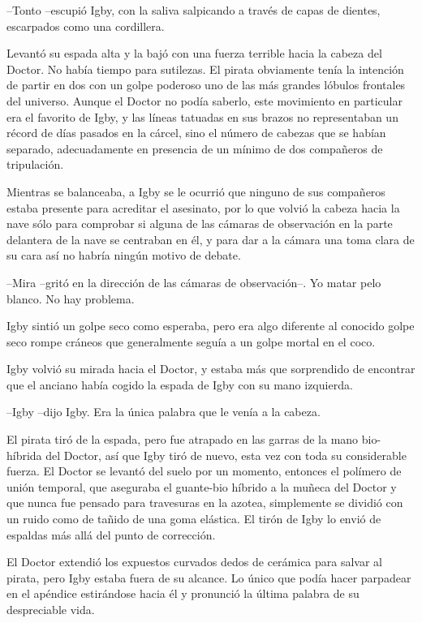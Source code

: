 --Tonto --escupió Igby, con la saliva salpicando a través de capas de dientes, escarpados como una cordillera.
 
Levantó su espada alta y la bajó con una fuerza terrible hacia la cabeza del Doctor. No había tiempo para sutilezas. El pirata obviamente tenía la intención de partir en dos con un golpe poderoso uno de las más grandes lóbulos frontales del universo. Aunque el Doctor no podía saberlo, este movimiento en particular era el favorito de Igby, y las líneas tatuadas en sus brazos no representaban un récord de días pasados en la cárcel, sino el número de cabezas que se habían separado, adecuadamente en presencia de un mínimo de dos compañeros de tripulación.
 
Mientras se balanceaba, a Igby se le ocurrió que ninguno de sus compañeros estaba presente para acreditar el asesinato, por lo que volvió la cabeza hacia la nave sólo para comprobar si alguna de las cámaras de observación en la parte delantera de la nave se centraban en él, y para dar a la cámara una toma clara de su cara así no habría ningún motivo de debate.
 
--Mira --gritó en la dirección de las cámaras de observación--. Yo matar pelo blanco. No hay problema.
 
Igby sintió un golpe seco como esperaba, pero era algo diferente al conocido golpe seco rompe cráneos que generalmente seguía a un golpe mortal en el coco.
 
Igby volvió su mirada hacia el Doctor, y estaba más que sorprendido de encontrar que el anciano había cogido la espada de Igby con su mano izquierda.
 
--Igby --dijo Igby. Era la única palabra que le venía a la cabeza.
 
El pirata tiró de la espada, pero fue atrapado en las garras de la mano bio-híbrida del Doctor, así que Igby tiró de nuevo, esta vez con toda su considerable fuerza. El Doctor se levantó del suelo por un momento, entonces el polímero de unión temporal, que aseguraba el guante-bio híbrido a la muñeca del Doctor y que nunca fue pensado para travesuras en la azotea, simplemente se dividió con un ruido como de tañido de una goma elástica. El tirón de Igby lo envió de espaldas más allá del punto de corrección.
 
El Doctor extendió los expuestos curvados dedos de cerámica para salvar al pirata, pero Igby estaba fuera de su alcance. Lo único que podía hacer parpadear en el apéndice estirándose hacia él y pronunció la última palabra de su despreciable vida.
 
